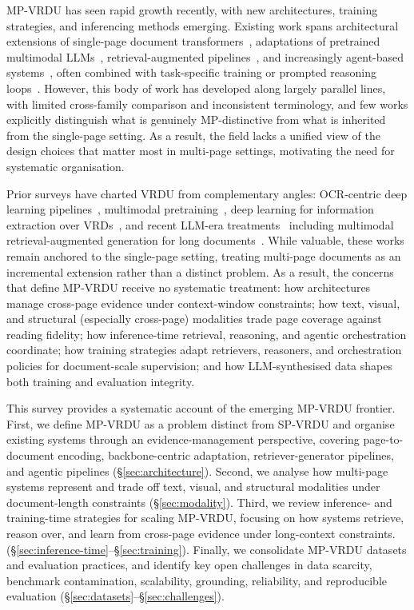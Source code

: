 \documentclass[11pt]{article}
\begin{document}
MP-VRDU has seen rapid growth recently, with new architectures, training strategies, and inferencing methods emerging. Existing work spans architectural extensions of single-page document transformers~\cite{tito2023hierarchical, blau2024gram}, adaptations of pretrained multimodal LLMs~\cite{duan2025docopilot, hu2025mplug2}, retrieval-augmented pipelines~\cite{cho2024m3docrag, tanaka2025vdocrag}, and increasingly agent-based systems~\cite{sun2025docagent, wang2025vidorag}, often combined with task-specific training or prompted reasoning loops~\cite{xiong2026docr1, han2025mdocagent}. However, this body of work has developed along largely parallel lines, with limited cross-family comparison and inconsistent terminology, and few works explicitly distinguish what is genuinely MP-distinctive from what is inherited from the single-page setting. As a result, the field lacks a unified view of the design choices that matter most in multi-page settings, motivating the need for systematic organisation.

Prior surveys have charted VRDU from complementary angles: OCR-centric deep learning pipelines~\cite{subramani2020survey}, multimodal pretraining~\cite{ding2026deep}, deep learning for information extraction over VRDs~\cite{gbada2025deep}, and recent LLM-era treatments~\cite{ding2025survey} including multimodal retrieval-augmented generation for long documents~\cite{gao2025scaling}. While valuable, these works remain anchored to the single-page setting, treating multi-page documents as an incremental extension rather than a distinct problem. As a result, the concerns that define MP-VRDU receive no systematic treatment: how architectures manage cross-page evidence under context-window constraints; how text, visual, and structural (especially cross-page) modalities trade page coverage against reading fidelity; how inference-time retrieval, reasoning, and agentic orchestration coordinate; how training strategies adapt retrievers, reasoners, and orchestration policies for document-scale supervision; and how LLM-synthesised data shapes both training and evaluation integrity.


This survey provides a systematic account of the emerging MP-VRDU frontier. First, we define MP-VRDU as a problem distinct from SP-VRDU and organise existing systems through an evidence-management perspective, covering page-to-document encoding, backbone-centric adaptation, retriever-generator pipelines, and agentic pipelines (§\ref{sec:architecture}). Second, we analyse how multi-page systems represent and trade off text, visual, and structural modalities under document-length constraints (§\ref{sec:modality}). Third, we review inference- and training-time strategies for scaling MP-VRDU, focusing on how systems retrieve, reason over, and learn from cross-page evidence under long-context constraints. (§\ref{sec:inference-time}--§\ref{sec:training}). Finally, we consolidate MP-VRDU datasets and evaluation practices, and identify key open challenges in data scarcity, benchmark contamination, scalability, grounding, reliability, and reproducible evaluation (§\ref{sec:datasets}--§\ref{sec:challenges}).
\end{document}
